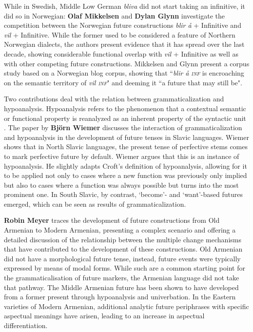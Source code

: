 \documentclass[output=paper,colorlinks,citecolor=brown]{langscibook}
\begin{document}
While in Swedish, Middle Low German \textit{bliva} did not start taking an infinitive, it did so in Norwegian: \textbf{Olaf Mikkelsen} and \textbf{Dylan Glynn} investigate the competition between the Norwegian future constructions \textit{blir å} + Infinitive and \textit{vil} + Infinitive. While the former used to be considered a feature of Northern Norwegian dialects, the authors present evidence that it has spread over the last decade, showing considerable functional overlap with \textit{vil }+ Infinitive as well as with other competing future constructions. Mikkelsen and Glynn present a corpus study based on a Norwegian blog corpus, showing that ``\textit{blir å \textsc{inf}} is encroaching on the semantic territory of \textit{vil \textsc{inf}}" and deeming it ``a future that may still be".

Two contributions deal with the relation between grammaticalization and hypoanalysis. Hypoanalysis refers to the phenomenon that a contextual semantic or functional property is reanalyzed as an inherent property of the syntactic unit \citep[see][126]{Croft2000}.  The paper by \textbf{Björn Wiemer}  discusses the interaction of grammaticalization and hypoanalysis in the development of future tenses in Slavic languages. Wiemer shows that in North Slavic languages, the present tense of perfective stems comes to mark perfective future by default. Wiemer argues that this is an instance of hypoanalysis. He slightly adapts Croft's definition of hypoanalysis, allowing for it to be applied not only to cases where a new function was previously only implied but also to cases where a function was always possible but turns into the most prominent one. In South Slavic, by contrast, `become'- and `want'-based futures emerged, which can be seen as results of grammaticalization.

\textbf{Robin Meyer} traces the development of future constructions from Old Armenian to Modern Armenian, presenting a complex scenario and offering a detailed discussion of the relationship between the multiple change mechanisms that have contributed to the development of these constructions.
Old Armenian did not have a morphological future tense, instead, future  events were typically expressed by means of modal forms. While such are a common starting point for the grammaticalisation of future markers,  the Armenian language did not take that pathway. The Middle Armenian future has been shown to have developed from a former present through hypoanalysis and univerbation. In the Eastern varieties of Modern Armenian, additional analytic future periphrases with specific aspectual meanings have arisen, leading to an increase in aspectual differentiation.
\end{document}
